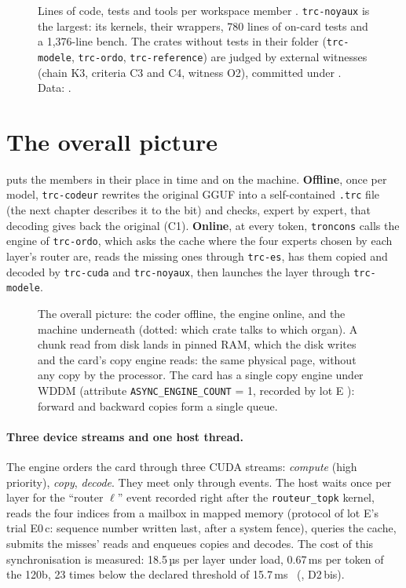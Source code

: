 \begin{figure}[ht]
\centering
\TdArchGrapheLignes
\caption[Lines of code, tests and tools per member]{Lines of code, tests and tools per workspace member \calc. \texttt{trc-noyaux} is the largest: its kernels, their wrappers, 780 lines of on-card tests and a 1{,}376-line bench. The crates without tests in their folder (\texttt{trc-modele}, \texttt{trc-ordo}, \texttt{trc-reference}) are judged by external witnesses (chain K3, criteria C3 and C4, witness O2), committed under . Data: .}
\label{t2arch:fig:lignes}
\end{figure}

\section{The overall picture}\label{t2arch:sec:ensemble}

 puts the members in their place in time and on the machine. \textbf{Offline}, once per model, \texttt{trc-codeur} rewrites the original GGUF into a self-contained \texttt{.trc} file (the next chapter describes it to the bit) and checks, expert by expert, that decoding gives back the original (C1). \textbf{Online}, at every token, \texttt{troncons} calls the engine of \texttt{trc-ordo}, which asks the cache where the four experts chosen by each layer's router are, reads the missing ones through \texttt{trc-es}, has them copied and decoded by \texttt{trc-cuda} and \texttt{trc-noyaux}, then launches the layer through \texttt{trc-modele}.

\begin{figure}[ht]
\centering
\TdArchEnsemble
\caption[The overall picture]{The overall picture: the coder offline, the engine online, and the machine underneath (dotted: which crate talks to which organ). A chunk read from disk lands in pinned RAM, which the disk writes and the card's copy engine reads: the same physical page, without any copy by the processor. The card has a single copy engine under WDDM (attribute \texttt{ASYNC\_ENGINE\_COUNT} = 1, recorded by lot E \mes): forward and backward copies form a single queue.}
\label{t2arch:fig:ensemble}
\end{figure}

\paragraph{Three device streams and one host thread.} The engine orders the card through three CUDA streams: \emph{compute} (high priority), \emph{copy}, \emph{decode}. They meet only through events. The host waits once per layer for the ``router $\ell$'' event recorded right after the \texttt{routeur\_topk} kernel, reads the four indices from a mailbox in mapped memory (protocol of lot E's trial E0\,c: sequence number written last, after a system fence), queries the cache, submits the misses' reads and enqueues copies and decodes. The cost of this synchronisation is measured: 18.5\,µs per layer under load, 0.67\,ms per token of the 120b, 23 times below the declared threshold of 15.7\,ms \mes~(, D2\,bis).

